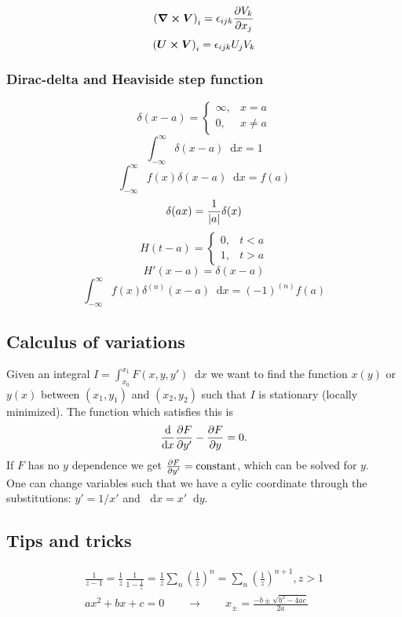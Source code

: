 \documentclass[a4paper, 10pt]{article}
\newcommand*\diff{\mathop{}\!\mathrm{d}}
\begin{document}
\begin{multicols*}{3}
$$ \left( \bm{\nabla} \cross \bm{V}\right)_i = \epsilon_{ijk}\pdv{V_k}{x_j}$$
$$ \left( \bm{U} \cross \bm{V}\right)_i = \epsilon_{ijk}U_jV_k$$

\subsubsection*{Dirac-delta and Heaviside step function}
\[
\delta(x-a)=\begin{cases}
\infty, & x=a \\
0, &  x\neq a
\end{cases}\]
$$ \int_{-\infty}^{\infty} \delta(x-a) \diff x = 1$$
$$ \int_{-\infty}^{\infty} f(x) \delta(x-a) \diff x = f(a)$$
$$ \delta(ax) = \frac{1}{\abs{a}}\delta(x)$$
\[
H(t-a)=\begin{cases}
0, & t<a\\
1, & t>a
\end{cases}\]
$$ H'(x-a) = \delta(x-a) $$
$$ \int_{-\infty}^{\infty} f(x) \delta^{(n)}(x-a) \diff x = (-1)^{(n)}f(a)$$



\begin{mdframed}
\subsection*{Calculus of variations}
\end{mdframed}
Given an integral $I=\int_{x_0}^{x_1} F(x, y, y') \diff x$ we want to find the function $x(y)$ or $y(x)$ between $(x_1, y_1)$ and $(x_2, y_2)$ such that $I$ is stationary (locally minimized). The function which satisfies this is
$$ \dv{}{x}\pdv{F}{y'} - \pdv{F}{y} = 0.$$
If $F$ has no $y$ dependence we get $\pdv{F}{y'}=\text{constant}$, which can be solved for $y$. \\
One can change variables such that we have a cylic coordinate through the substitutions: $y' = 1/x'$ and $\diff x = x' \diff y$.
\begin{mdframed}
\subsection*{Tips and tricks}
\end{mdframed}
\begin{multline*}
  \frac{1}{z-1} = \frac{1}{z}\,\frac{1}{1-\frac{1}{z}} = \frac{1}{z}\sum_n\left(\frac{1}{z}\right)^n = \sum_n\left(\frac{1}{z}\right)^{n+1}, z>1 \\
  ax^2 + bx + c = 0 \qquad \rightarrow \qquad x_{\pm} = \frac{-b \pm \sqrt{b^2 - 4ac}}{2a}
\end{multline*}
\newpage



\end{multicols*}
\end{document}
